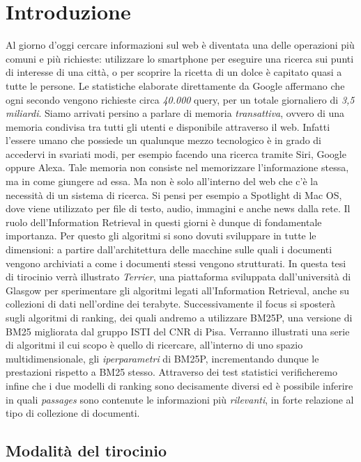 \chapter{Introduzione}
Al giorno d'oggi cercare informazioni sul web è diventata una delle operazioni più comuni e più richieste:
utilizzare lo smartphone per eseguire una ricerca sui punti di interesse di una città, o per scoprire la ricetta di un dolce è capitato quasi a tutte le persone.
Le statistiche elaborate direttamente da Google affermano che ogni secondo vengono richieste circa \textit{40.000} query, per un totale
giornaliero di \textit{3,5 miliardi}.
Siamo arrivati persino a parlare di memoria \textit{transattiva}, ovvero di una memoria condivisa tra tutti gli utenti e disponibile attraverso il web.
Infatti l'essere umano che possiede un qualunque mezzo tecnologico è in grado di accedervi in svariati modi, per esempio facendo una ricerca tramite Siri, Google oppure Alexa.
Tale memoria non consiste nel memorizzare l'informazione stessa, ma in come giungere ad essa.
Ma non è solo all'interno del web che c'è la necessità di un sistema di ricerca. Si pensi per esempio a Spotlight di Mac OS, dove
viene utilizzato  per file di testo, audio, immagini e anche news dalla rete.
Il ruolo dell'Information Retrieval in questi giorni è dunque di fondamentale importanza.
Per questo gli algoritmi si sono dovuti sviluppare in tutte le dimensioni: a partire dall'architettura delle macchine sulle quali i documenti vengono archiviati a come i documenti stessi vengono strutturati. In questa tesi di tirocinio verrà illustrato \textit{Terrier}, una piattaforma sviluppata dall'università di Glasgow
per sperimentare gli algoritmi legati all'Information Retrieval, anche su collezioni di dati nell'ordine dei terabyte.  Successivamente il focus si sposterà
sugli algoritmi di ranking, dei quali andremo a utilizzare BM25P, una versione di BM25 migliorata dal gruppo ISTI del CNR di Pisa.
Verranno illustrati una serie di algoritmi il cui scopo è quello di ricercare, all'interno di uno spazio multidimensionale,
gli \textit{iperparametri} di BM25P, incrementando dunque le prestazioni rispetto a BM25 stesso.
Attraverso dei test statistici verificheremo infine che i due modelli di ranking sono decisamente diversi ed è possibile
inferire in quali \textit{passages} sono contenute le informazioni più \textit{rilevanti}, in forte relazione al tipo di collezione di documenti.


\section{Modalità del tirocinio}

